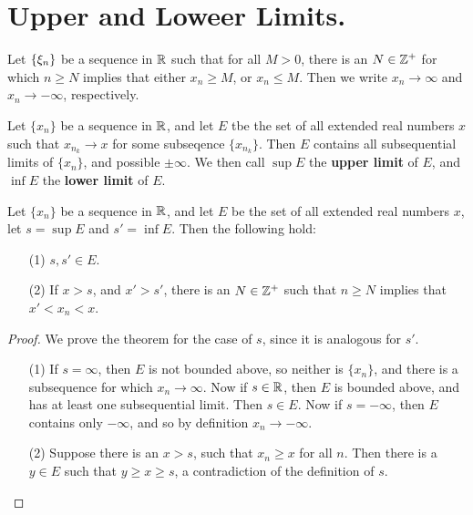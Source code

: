 
\section{Upper and Loweer Limits.}

Let $\{\xi_n\}$ be a sequence in  $\mathbb{R}$ such that for all  $M>0$, there is an  $N \in \mathbb{Z}^+$
for which  $n \geq N$ implies that either  $x_n \geq M$, or  $x_n \leq M$. Then we write
 $x_n \rightarrow \infty$ and  $x_n \rightarrow -\infty$, respectively.

 \begin{definition}
     Let $\{x_n\}$ be a sequence in $\mathbb{R}$, and let $E$ tbe the set of all extended real
     numbers $x$  such that $x_{n_k} \rightarrow x$ for some subseqence  $\{x_{n_k}\}$. Then
     $E$ contains all subsequential limits of  $\{x_n\}$, and possible  $\pm\infty$. We then
     call  $\sup{E}$ the  \textbf{upper limit} of $E$, and  $\inf{E}$ the \textbf{lower limit} of
     $E$.
 \end{definition}

 \begin{theorem}\label{4.1.1}
     Let $\{x_n\}$ be a sequence in  $\mathbb{R}$, and let  $E$ be the set of all extended real
     numbers  $x$, let  $s=\sup{E}$ and  $s'=\inf{E}$. Then the following hold:
         \begin{enumerate}
             \item[(1)] $s,s' \in E$.

             \item[(2)] If $x>s$, and $x'>s'$, there is an $N \in \mathbb{Z}^+$ such that $n \geq N$
                 implies that $x'<x_n<x$.
        \end{enumerate}
 \end{theorem}
 \begin{proof}
     We prove the theorem for the case of $s$, since it is analogous for  $s'$.
        \begin{enumerate}
            \item[(1)] If $s=\infty$, then $E$ is not bounded above, so neither is  $\{x_n\}$, and
                there is a subsequence for which $x_n \rightarrow \infty$. Now if $s \in \mathbb{R}$, then
                 $E$ is bounded above, and has at least one subsequential limit. Then  $s \in E$.
                 Now if  $s=-\infty$, then  $E$ contains only $-\infty$, and so by definition
                 $x_n \rightarrow -\infty$.

             \item[(2)] Suppose there is an $x>s$, such that  $x_n \geq x$ for all  $n$. Then there
                 is a  $y \in E$ such that  $y \geq x \geq s$, a contradiction of the definition of  $s$.
        \end{enumerate}
 \end{proof}

